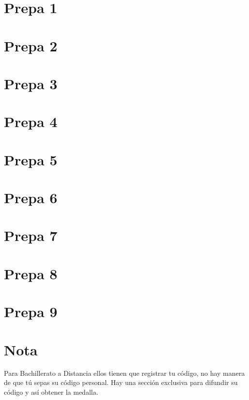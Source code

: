 \section{Prepa 1}

\section{Prepa 2}

\section{Prepa 3}

\section{Prepa 4}

\section{Prepa 5}

\section{Prepa 6}

\section{Prepa 7}

\section{Prepa 8}

\section{Prepa 9}

\section*{Nota}
Para Bachillerato a Distancia ellos tienen que registrar tu código, no hay manera de que tú sepas su código personal. Hay una sección exclusiva para difundir su código y así obtener la medalla.
